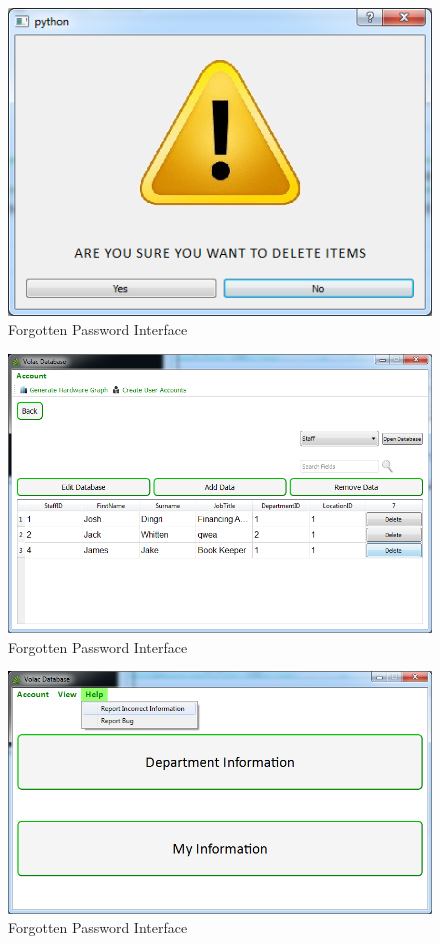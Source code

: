 \begin{figure}[H]
    \includegraphics[width=\textwidth]{./Testing/Images/NoButton.png}
    \caption{Forgotten Password Interface} \label{fig:NoButton}
\end{figure}

\begin{figure}[H]
    \includegraphics[width=\textwidth]{./Testing/Images/RemovedData.png}
    \caption{Forgotten Password Interface} \label{fig:RemovedData}
\end{figure}

\begin{figure}[H]
    \includegraphics[width=\textwidth]{./Testing/Images/HelpMenu.png}
    \caption{Forgotten Password Interface} \label{fig:HelpMenu}
\end{figure}

